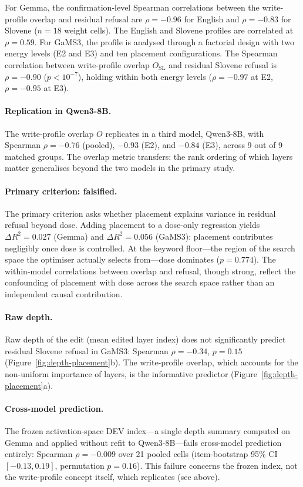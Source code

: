 \documentclass[11pt,letterpaper]{article}
\begin{document}
For Gemma, the confirmation-level Spearman correlations between the write-profile overlap and residual refusal are $\rho = -0.96$ for English and $\rho = -0.83$ for Slovene ($n = 18$ weight cells). The English and Slovene profiles are correlated at $\rho = 0.59$. For GaMS3, the profile is analysed through a factorial design with two energy levels (E2 and E3) and ten placement configurations. The Spearman correlation between write-profile overlap $O_{\mathrm{SL}}$ and residual Slovene refusal is $\rho = -0.90$ ($p < 10^{-7}$), holding within both energy levels ($\rho = -0.97$ at E2, $\rho = -0.95$ at E3).

\paragraph{Replication in Qwen3-8B.} The write-profile overlap $O$ replicates in a third model, Qwen3-8B, with Spearman $\rho = -0.76$ (pooled), $-0.93$ (E2), and $-0.84$ (E3), across 9 out of 9 matched groups. The overlap metric transfers: the rank ordering of which layers matter generalises beyond the two models in the primary study.

\paragraph{Primary criterion: falsified.} The primary criterion asks whether placement explains variance in residual refusal beyond dose. Adding placement to a dose-only regression yields $\Delta R^2 = 0.027$ (Gemma) and $\Delta R^2 = 0.056$ (GaMS3): placement contributes negligibly once dose is controlled. At the keyword floor---the region of the search space the optimiser actually selects from---dose dominates ($p = 0.774$). The within-model correlations between overlap and refusal, though strong, reflect the confounding of placement with dose across the search space rather than an independent causal contribution.

\paragraph{Raw depth.} Raw depth of the edit (mean edited layer index) does not significantly predict residual Slovene refusal in GaMS3: Spearman $\rho = -0.34$, $p = 0.15$ (Figure~\ref{fig:depth-placement}b). The write-profile overlap, which accounts for the non-uniform importance of layers, is the informative predictor (Figure~\ref{fig:depth-placement}a).

\paragraph{Cross-model prediction.} The frozen activation-space DEV index---a single depth summary computed on Gemma and applied without refit to Qwen3-8B---fails cross-model prediction entirely: Spearman $\rho = -0.009$ over 21 pooled cells (item-bootstrap 95\% CI $[-0.13, 0.19]$, permutation $p = 0.16$). This failure concerns the frozen index, not the write-profile concept itself, which replicates (see above).
\end{document}
